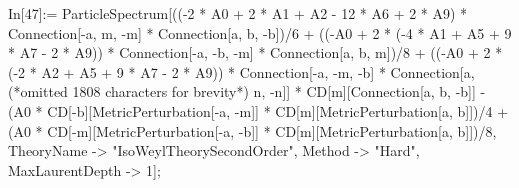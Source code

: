 In[47]:= ParticleSpectrum[((-2 * A0 + 2 * A1 + A2 - 12 * A6 + 2 * A9) * Connection[-a, m, -m] * Connection[a, b, -b])/6 + ((-A0 + 2 * (-4 * A1 + A5 + 9 * A7 - 2 * A9)) * Connection[-a, -b, -m] * Connection[a, b, m])/8 + ((-A0 + 2 * (-2 * A2 + A5 + 9 * A7 - 2 * A9)) * Connection[-a, -m, -b] * Connection[a, (*omitted 1808 characters for brevity*) n, -n]] * CD[m][Connection[a, b, -b]] - (A0 * CD[-b][MetricPerturbation[-a, -m]] * CD[m][MetricPerturbation[a, b]])/4 + (A0 * CD[-m][MetricPerturbation[-a, -b]] * CD[m][MetricPerturbation[a, b]])/8, TheoryName -> "IsoWeylTheorySecondOrder", Method -> "Hard", MaxLaurentDepth -> 1];